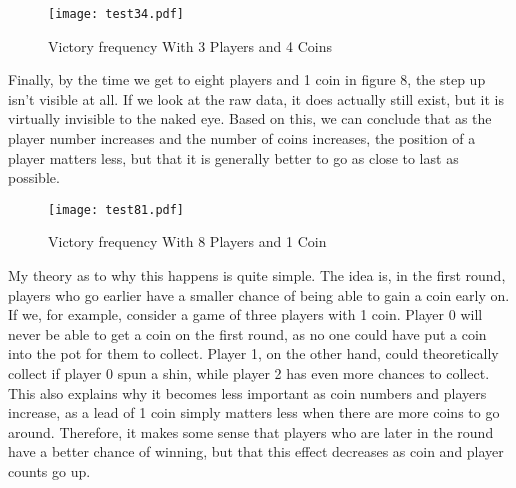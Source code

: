 \documentclass[11pt]{article}
\begin{document}
\begin{figure}[tbp]
\begin{centering}
\texttt{[image: test34.pdf]}
\caption{Victory frequency With 3 Players and 4 Coins}
\end{centering}
\end{figure}

Finally, by the time we get to eight players and 1 coin in figure 8, the step up isn't visible at all. If we look at the raw data, it does actually still exist, but it is virtually invisible to the naked eye. Based on this, we can conclude that as the player number increases and the number of coins increases, the position of a player matters less, but that it is generally better to go as close to last as possible.

\begin{figure}[tbp]
\begin{centering}
\texttt{[image: test81.pdf]}
\caption{Victory frequency With 8 Players and 1 Coin}
\end{centering}
\end{figure}

My theory as to why this happens is quite simple. The idea is, in the first round, players who go earlier have a smaller chance of being able to gain a coin early on. If we, for example, consider a game of three players with 1 coin. Player 0 will never be able to get a coin on the first round, as no one could have put a coin into the pot for them to collect. Player 1, on the other hand, could theoretically collect if player 0 spun a shin, while player 2 has even more chances to collect. This also explains why it becomes less important as coin numbers and players increase, as a lead of 1 coin simply matters less when there are more coins to go around. Therefore, it makes some sense that players who are later in the round have a better chance of winning, but that this effect decreases as coin and player counts go up.
\end{document}
